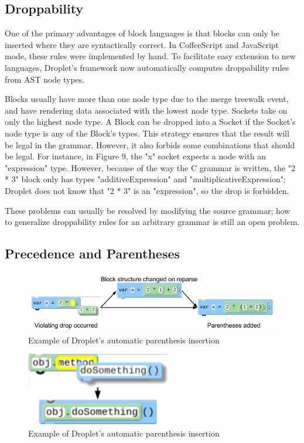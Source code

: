 \documentclass[conference]{IEEEtran}
\begin{document}
\subsection{Droppability}
One of the primary advantages of block languages is that blocks can only be inserted where they are syntactically correct. In CoffeeScript and JavaScript mode, these rules were implemented by hand. To facilitate easy extension to new languages, Droplet's framework now automatically computes droppability rules from AST node types.

Blocks usually have more than one node type due to the merge treewalk event, and have rendering data associated with the lowest node type. Sockets take on only the highest node type. A Block can be dropped into a Socket if the Socket's node type is any of the Block's types. This strategy ensures that the result will be legal in the grammar. However, it also forbids some combinations that should be legal. For instance, in Figure 9, the "x" socket expects a node with an "expression" type. However, because of the way the C grammar is written, the "2 * 3" block only has types "additiveExpression" and "multiplicativeExpression"; Droplet does not know that "2 * 3" is an "expression", so the drop is forbidden.

These problems can usually be resolved by modifying the source grammar; how to generalize droppability rules for an arbitrary grammar is still an open problem.

\subsection{Precedence and Parentheses}
\begin{figure}
\centering
\includegraphics[width=5in]{autoparen.png}
\caption{Example of Droplet's automatic parenthesis insertion}
\label{autoparen}
\end{figure}

\begin{figure}
\centering
\includegraphics[width=2.5in]{method_drop.png}
\caption{Example of Droplet's automatic parenthesis insertion}
\label{bad_paren}
\end{figure}
\end{document}
